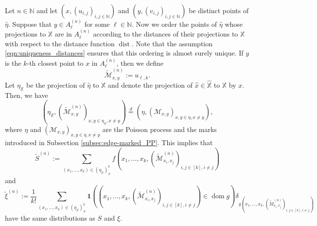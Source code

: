 \documentclass{article}
\theoremstyle{definition}
\numberwithin{equation}{section}
\theoremstyle{remark}
\begin{document}
Let $n\in\mathbb{N}$ and let $(x,(u_{i,j})_{i,j\in\mathbb{N}})$ and $(y,(v_{i,j})_{i,j\in\mathbb{N}})$ be distinct points of $\widehat{\eta}$. Suppose that $y\in A^{(n)}_\ell$ for some $\ell\in\mathbb{N}$. Now we order the points of $\widehat{\eta}$ whose projections to $\mathbb{X}$ are in $A^{(n)}_\ell$ according to the distances of their projections to $\mathbb{X}$ with respect to the distance function $\operatorname{dist}$. Note that the assumption \eqref{eqn:uniqueness_distances} ensures that this ordering is almost surely unique. If $y$ is the $k$-th closest point to $x$ in $A^{(n)}_\ell$, then we define 
\begin{equation}
	\widetilde{\mathcal{M}}^{(n)}_{x,y}:=u_{\ell,k}.
\end{equation}
Let $\eta_{\mathbb{X}}$ be the projection of $\widehat{\eta}$ to $\mathbb{X}$ and denote the projection of $\hat{x}\in\widehat{\mathbb{X}}$ to $\mathbb{X}$ by $x$. Then, we have
$$
(\eta_{\mathbb{X}}, (\widetilde{\mathcal{M}}^{(n)}_{x,y})_{x,y\in\eta_{\mathbb{X}}, x\ne y}) \overset{d}{=} (\eta, (\mathcal{M}_{x,y})_{x,y\in\eta,x\neq y}),
$$
where $\eta$ and $(\mathcal{M}_{x,y})_{x,y\in\eta,x\neq y}$ are the Poisson process and the marks introduced in Subsection \ref{subsec:edge-marked_PP}.
This implies that
\begin{equation}
	\widetilde{S}^{(n)} := \sum_{(x_1,\ldots,x_k)\in(\eta_{\mathbb{X}})^k_{\neq}} f(x_1,\ldots,x_k, (\widetilde{\mathcal{M}}^{(n)}_{x_i,x_j})_{i,j\in[k],i\neq j}) %
\end{equation}
and
$$
\widetilde{\xi}^{(n)} := \frac{1}{k!} \sum_{(x_1,\ldots,x_k)\in(\eta_{\mathbb{X}})^k_{\neq}} \mathbf{1}((x_1,\ldots,x_k, (\widetilde{\mathcal{M}}^{(n)}_{x_i,x_j})_{i,j\in[k],i\neq j})\in\operatorname{dom} g) \delta_{g(x_1,\ldots,x_k, (\widetilde{M}^{(n)}_{x_i,x_j})_{i,j\in[k],i\neq j})}
$$
have the same distributions as $S$ and $\xi$.
\end{document}
